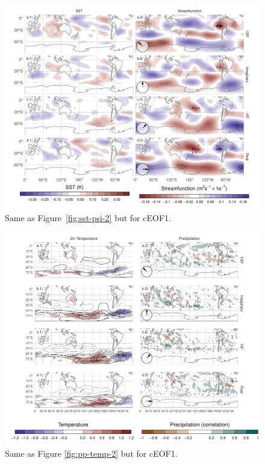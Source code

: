 \documentclass[smallextended]{svjour3}       %
\begin{document}
\newpage



\begin{figure}
\includegraphics{../figures/sst-psi-1-1} \caption{Same as Figure~\ref{fig:sst-psi-2} but for cEOF1.}\label{fig:sst-psi-1}
\end{figure}



\begin{figure}
\centering
\includegraphics{../figures/pp-temp-1-1.pdf}
\caption{\label{fig:pp-temp-1}Same as Figure \ref{fig:pp-temp-2} but for cEOF1.}
\end{figure}
\end{document}
